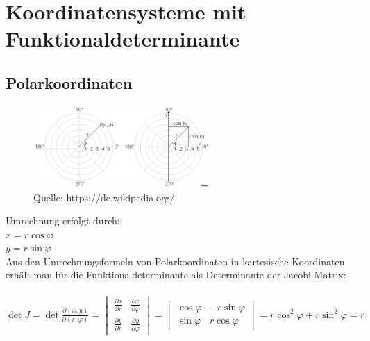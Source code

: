 

\section{Koordinatensysteme mit Funktionaldeterminante}

\subsection{Polarkoordinaten}
\begin{figure}[h!]
\centering
    \includegraphics[width=0.6\textwidth]{images/Ebene_polarkoordinaten.PNG}
    \caption{Quelle: https://de.wikipedia.org/}
    
\end{figure}

Umrechnung erfolgt durch: \\
$x=r\cos\varphi$\\
$y=r\sin\varphi$\\

Aus den Umrechnungsformeln von Polarkoordinaten in kartesische Koordinaten erhält man für die Funktionaldeterminante als Determinante der Jacobi-Matrix:\\
\\$
\det J = \det\frac{\partial(x,y)}{\partial(r,\varphi)}
=\begin{vmatrix}
  \frac{\partial x}{\partial r} & \frac{\partial x}{\partial \varphi} \\
  \frac{\partial y}{\partial r} & \frac{\partial y}{\partial \varphi}
\end{vmatrix}
=\begin{vmatrix}
  \cos\varphi & -r\sin\varphi \\
  \sin\varphi &  r\cos\varphi
\end{vmatrix} =r\cos^2\varphi + r\sin^2\varphi = r
$

